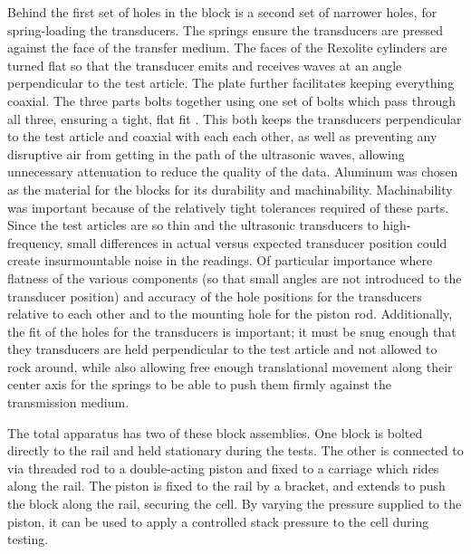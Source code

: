 Behind the first set of holes in the block is a second set of narrower holes, for spring-loading the transducers. The springs ensure the transducers are pressed against the face of the transfer medium. The faces of the Rexolite cylinders are turned flat so that the transducer emits and receives waves at an angle perpendicular to the test article.  The plate further facilitates keeping everything coaxial. The three parts bolts together using one set of bolts which pass through all three, ensuring a tight, flat fit . This both keeps the transducers perpendicular to the test article and coaxial with each each other, as well as preventing any disruptive air from getting in the path of the ultrasonic waves, allowing unnecessary attenuation to reduce the quality of the data. Aluminum was chosen as the material for the blocks for its durability and machinability. Machinability was important because of the relatively tight tolerances required of these parts. Since the test articles are so thin and the ultrasonic transducers to high-frequency, small differences in actual versus expected transducer position could create insurmountable noise in the readings. Of particular importance where flatness of the various components (so that small angles are not introduced to the transducer position) and accuracy of the hole positions for the transducers relative to each other and to the mounting hole for the piston rod. Additionally, the fit of the holes for the transducers is important; it must be snug enough that they transducers are held perpendicular to the test article and not allowed to rock around, while also allowing free enough translational movement along their center axis for the springs to be able to push them firmly against the transmission medium.

The total apparatus has two of these block assemblies. One block is bolted directly to the rail and held stationary during the tests. The other is connected to via threaded rod to a double-acting piston and fixed to a carriage which rides along the rail. The piston is fixed to the rail by a bracket, and extends to push the block along the rail, securing the cell. By varying the pressure supplied to the piston, it can be used to apply a controlled stack pressure to the cell during testing.


